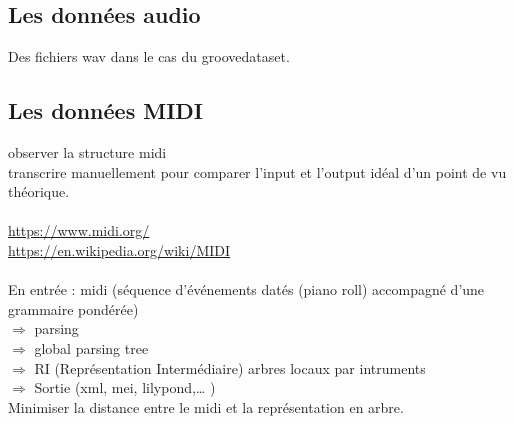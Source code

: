 \subsection{Les données audio}
Des fichiers wav dans le cas du groovedataset.

\subsection{Les données MIDI}
observer la structure midi\\
transcrire manuellement pour comparer l’input et l’output idéal d’un point de vu théorique.\\\\
\url{https://www.midi.org/}\\
\url{https://en.wikipedia.org/wiki/MIDI}\\\\
En entrée : midi (séquence d’événements datés (piano roll) accompagné d’une grammaire pondérée)\\
$\Rightarrow$ parsing\\
$\Rightarrow$ global parsing tree\\
$\Rightarrow$ RI (Représentation Intermédiaire) arbres locaux par intruments\\
$\Rightarrow$ Sortie (xml, mei, lilypond,… )\\
Minimiser la distance entre le midi et la représentation en arbre.\\\\